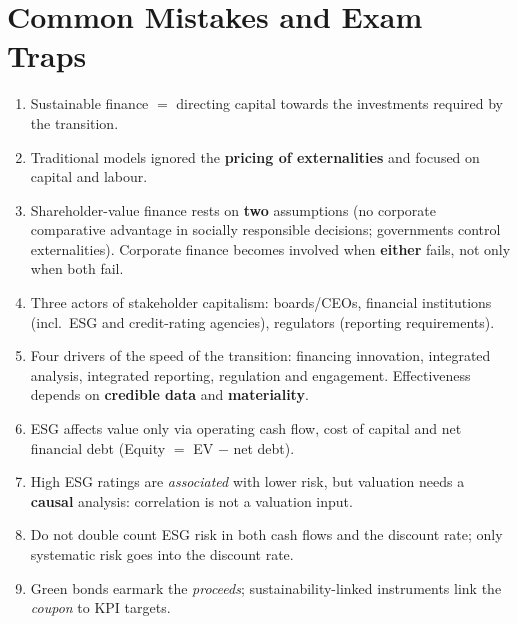 \section{Common Mistakes and Exam Traps}
\begin{trapbox}
\begin{enumerate}[leftmargin=*]
  \item Sustainable finance $=$ directing capital towards the investments required by the transition.
  \item Traditional models ignored the \textbf{pricing of externalities} and focused on capital and labour.
  \item Shareholder-value finance rests on \textbf{two} assumptions (no corporate comparative advantage in socially responsible decisions; governments control externalities). Corporate finance becomes involved when \textbf{either} fails, not only when both fail.
  \item Three actors of stakeholder capitalism: boards/CEOs, financial institutions (incl.\ ESG and credit-rating agencies), regulators (reporting requirements).
  \item Four drivers of the speed of the transition: financing innovation, integrated analysis, integrated reporting, regulation and engagement. Effectiveness depends on \textbf{credible data} and \textbf{materiality}.
  \item ESG affects value only via operating cash flow, cost of capital and net financial debt (Equity $=$ EV $-$ net debt).
  \item High ESG ratings are \emph{associated} with lower risk, but valuation needs a \textbf{causal} analysis: correlation is not a valuation input.
  \item Do not double count ESG risk in both cash flows and the discount rate; only systematic risk goes into the discount rate.
  \item Green bonds earmark the \emph{proceeds}; sustainability-linked instruments link the \emph{coupon} to KPI targets.
\end{enumerate}
\end{trapbox}
